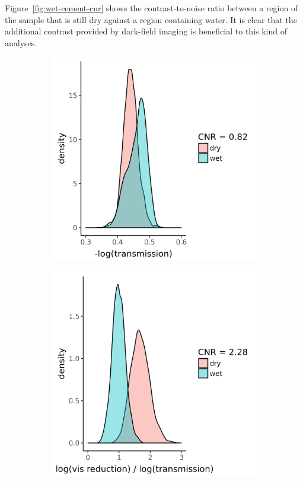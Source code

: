 Figure~\ref{fig:wet-cement-cnr} shows the contrast-to-noise ratio between a
region of the sample that is still dry against a region containing water. It
is clear that the additional contrast provided by dark-field imaging is
beneficial to this kind of analyses.
\begin{figure}[htb]
    \centering
    \begin{subfigure}[b]{.49\textwidth}
    \centering
    \includegraphics[width=\textwidth]{gfx/wet-cement/cnr_absorption.png}
    \caption{}
    \label{fig:wet-cement-cnr-absorption}
    \end{subfigure}
    \hfill
    \begin{subfigure}[b]{.49\textwidth}
    \centering
    \includegraphics[width=\textwidth]{gfx/wet-cement/cnr_ratio.png}

\end{subfigure}
\end{figure}
